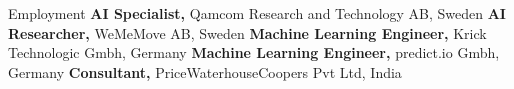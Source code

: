 \begin{rubric}{Employment}
%
	\textbf{AI Specialist,} Qamcom Research and Technology AB, Sweden  
%
%
\entry*[2019 -- 2021]%
	\textbf{AI Researcher,} WeMeMove AB, Sweden
%
\entry*[2018 -- 2019]%
	\textbf{Machine Learning Engineer,} Krick Technologic Gmbh, Germany
%
\entry*[2017 -- 2019]%
	\textbf{Machine Learning Engineer,} predict.io Gmbh, Germany
%
\entry*[2012 -- 2015]%
	\textbf{Consultant,} PriceWaterhouseCoopers Pvt Ltd, India
%
\end{rubric}